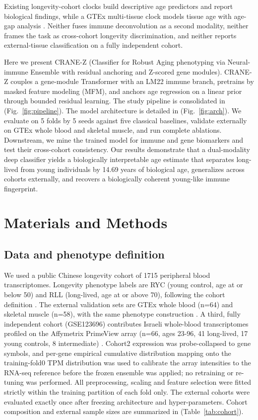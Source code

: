 \documentclass[11pt,a4paper]{article}
\begin{document}
Existing longevity-cohort clocks build descriptive age predictors and report biological findings, while a GTEx multi-tissue clock models tissue age with age-gap analysis \cite{orange2026brief}. Neither fuses immune deconvolution as a second modality, neither frames the task as cross-cohort longevity discrimination, and neither reports external-tissue classification on a fully independent cohort.

Here we present CRANE-Z (Classifier for Robust Aging phenotyping via Neural-immune Ensemble with residual anchoring and Z-scored gene modules). CRANE-Z couples a gene-module Transformer with an LM22 immune branch, pretrains by masked feature modeling (MFM), and anchors age regression on a linear prior through bounded residual learning. The study pipeline is consolidated in (Fig.~\ref{fig:pipeline}). The model architecture is detailed in (Fig.~\ref{fig:arch}). We evaluate on 5 folds by 5 seeds against five classical baselines, validate externally on GTEx whole blood and skeletal muscle, and run complete ablations. Downstream, we mine the trained model for immune and gene biomarkers and test their cross-cohort consistency. Our results demonstrate that a dual-modality deep classifier yields a biologically interpretable age estimate that separates long-lived from young individuals by 14.69 years of biological age, generalizes across cohorts externally, and recovers a biologically coherent young-like immune fingerprint.

\section{Materials and Methods}\label{sec:methods}
\subsection{Data and phenotype definition}\label{sec:data}
We used a public Chinese longevity cohort of 1715 peripheral blood transcriptomes. Longevity phenotype labels are RYC (young control, age at or below 50) and RLL (long-lived, age at or above 70), following the cohort definition \cite{sebastiani2012genetic,deelen2019meta}. The external validation sets are GTEx whole blood (n=64) and skeletal muscle (n=58), with the same phenotype construction \cite{gtex2015consortium,gtex2020consortium}. A third, fully independent cohort (GSE123696) contributes Israeli whole-blood transcriptomes profiled on the Affymetrix PrimeView array (n=66, ages 23-96, 41 long-lived, 17 young controls, 8 intermediate) \cite{alpert_2019}. Cohort2 expression was probe-collapsed to gene symbols, and per-gene empirical cumulative distribution mapping onto the training-fold0 TPM distribution was used to calibrate the array intensities to the RNA-seq reference before the frozen ensemble was applied; no retraining or re-tuning was performed. All preprocessing, scaling and feature selection were fitted strictly within the training partition of each fold only. The external cohorts were evaluated exactly once after freezing architecture and hyper-parameters. Cohort composition and external sample sizes are summarized in (Table~\ref{tab:cohort}).
\end{document}
